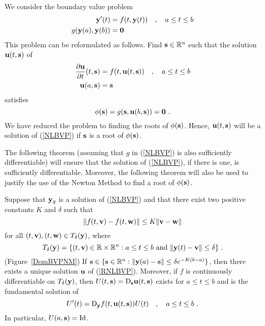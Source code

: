 We consider the boundary value problem
\begin{equation} \label{NLBVP}
\begin{split}
\mathbf{y}'(t) &= f(t,\mathbf{y}(t)) \quad , \quad a \leq t \leq b \\
g(\mathbf{y}(a), \mathbf{y}(b)) &= \mathbf{0}
\end{split}
\end{equation}
This problem can be reformulated as follows.  Find $\mathbf{s} \in \mathbb{R}^n$
such that the solution $\mathbf{u}(t,\mathbf{s})$ of
\begin{equation} \label{RNLBVP}
\begin{split}
\frac{\partial{\mathbf{u}}}{\partial{t}}(t,\mathbf{s}) &= f(t, \mathbf{u}(t,\mathbf{s})) \quad , \quad
a \leq t \leq b \\
\mathbf{u}(a,\mathbf{s})&= \mathbf{s}
\end{split}
\end{equation}
satisfies
\begin{equation} \label{Iter}
\phi(\mathbf{s}) = g(\mathbf{s},\mathbf{u}(b,\mathbf{s})) = \mathbf{0} \ .
\end{equation}
We have reduced the problem to finding the roots of
$\phi(\mathbf{s})$.  Hence, $\mathbf{u}(t,\mathbf{s})$ will be a solution
of (\ref{NLBVP}) if $\mathbf{s}$ is a root of $\phi(\mathbf{s})$.

The following theorem (assuming that $g$ in (\ref{NLBVP}) is also
sufficiently differentiable) will ensure that the solution of
(\ref{NLBVP}), if there is one, is sufficiently differentiable.
Moreover, the following theorem will also be used to justify
the use of the Newton Method to find a root of $\phi(\mathbf{s})$.

\begin{theorem}
Suppose that $\mathbf{y}_g$ is a solution of (\ref{NLBVP}) and that there
exist two positive constants $K$ and $\delta$ such that
\[
\| f(t,\mathbf{v}) - f(t,\mathbf{w}) \| \leq
K \| \mathbf{v} - \mathbf{w} \|
\]
for all $(t,\mathbf{v}),(t,\mathbf{w}) \in T_\delta(\mathbf{y})$, where
\[
T_\delta(\mathbf{y}) = \{ (t,\mathbf{v}) \in \mathbb{R}\times \mathbb{R}^n : a \leq t \leq b
\text{ and } \| \mathbf{y}(t) - \mathbf{v} \| \leq \delta \} \ .
\]
(Figure~\ref{DomBVPNM})
If $\mathbf{s} \in \{ \mathbf{s}\in\mathbb{R}^n : \| \mathbf{y}(a) - \mathbf{s}\|
\leq \delta e^{-K(b-a)} \}$, then there exists a unique solution
$\mathbf{u}$ of (\ref{RNLBVP}).  Moreover, if
$f$ is continuously differentiable on $T_\delta(\mathbf{y})$, then
$\displaystyle U(t,\mathbf{s}) = \mathrm{D}_{\mathbf{s}} \mathbf{u}(t,\mathbf{s})$
exists for $a \leq t \leq b$ and is the fundamental solution of
\begin{equation} \label{EforFS}
U'(t) = \mathrm{D}_{\mathbf{y}} f(t,\mathbf{u}(t,\mathbf{s})) U(t) \quad , \quad
a \leq t \leq b \ .
\end{equation}
In particular, $U(a,\mathbf{s}) = \operatorname{Id}$.
\label{smoothSol}
\end{theorem}

